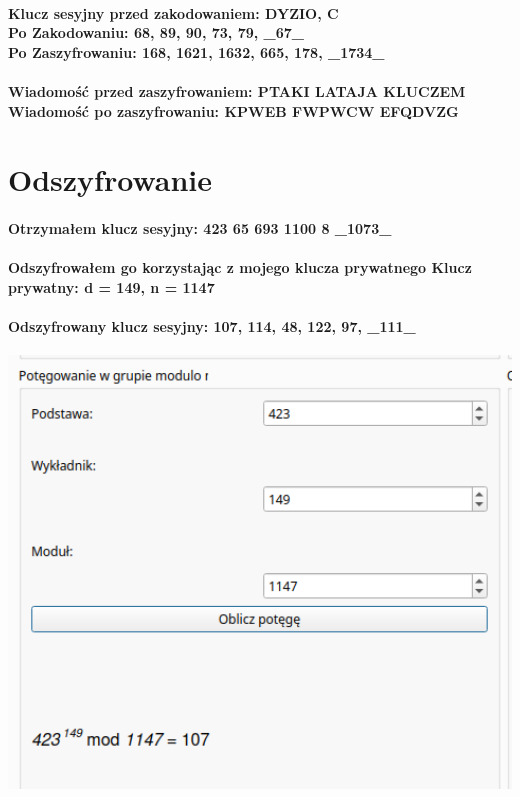 \documentclass{article}[12pt]
\begin{document}
\paragraph{Klucz sesyjny przed zakodowaniem: DYZIO, C \\ Po Zakodowaniu: 68, 89, 90, 73, 79, \_67\_ \\ Po Zaszyfrowaniu: 168, 1621, 1632, 665, 178, \_1734\_}
\paragraph{Wiadomość przed zaszyfrowaniem: PTAKI LATAJA KLUCZEM \\ Wiadomość po zaszyfrowaniu: KPWEB FWPWCW EFQDVZG}

\section{Odszyfrowanie}
\paragraph{Otrzymałem klucz sesyjny:  423 65 693 1100 8 \_1073\_}
\paragraph{Odszyfrowałem go korzystając z mojego klucza prywatnego Klucz prywatny: d = 149, n = 1147}
\paragraph{Odszyfrowany klucz sesyjny: 107, 114, 48, 122, 97, \_111\_ \\}
\includegraphics[width=1\textwidth]{seven.png}
\end{document}
